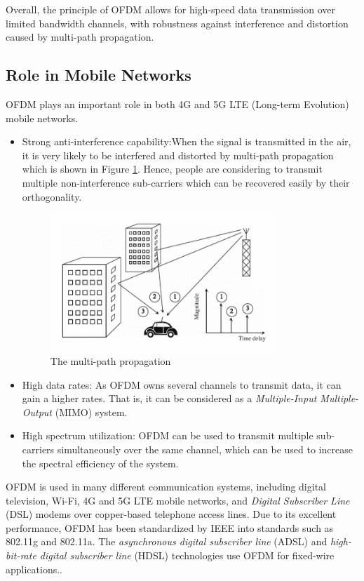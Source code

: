 \documentclass{article}
\numberwithin{figure}{section}
\numberwithin{equation}{section}
\begin{document}
Overall, the principle of OFDM allows for high-speed data transmission over limited bandwidth channels, with robustness against interference and distortion caused by multi-path propagation. 

\subsection{Role in Mobile Networks}
OFDM plays an important role in both 4G and 5G LTE (Long-term Evolution) mobile networks.
\begin{itemize}
    \item Strong anti-interference capability:When the signal is transmitted in the air, it is very likely to be interfered and distorted by multi-path propagation which is shown in Figure \ref{fig:multipath propagation}. Hence, people are considering to transmit multiple non-interference sub-carriers which can be recovered easily by their orthogonality.
    \begin{figure}[!ht]
        \centering
        \includegraphics[width=0.8\textwidth]{images/multipath propagation.png}
        \caption{\label{fig:multipath propagation}The multi-path propagation}
    \end{figure}
    \item High data rates: As OFDM owns several channels to transmit data, it can gain a higher rates. That is, it can be considered as a \textit{Multiple-Input Multiple-Output} (MIMO) system.
    \item High spectrum utilization: OFDM can be used to transmit multiple sub-carriers simultaneously over the same channel, which can be used to increase the spectral efficiency of the system.
\end{itemize}

OFDM is used in many different communication systems, including digital television, Wi-Fi, 4G and 5G LTE  mobile networks, and \textit{Digital Subscriber Line} (DSL) modems over copper-based telephone access lines. Due to its excellent performance, OFDM has been standardized by IEEE into standards such as 802.11g and 802.11a. The \textit{asynchronous digital subscriber line} (ADSL) and \textit{high-bit-rate digital subscriber line} (HDSL) technologies use OFDM for fixed-wire applications.\cite{RN78, RN79}.
\end{document}
